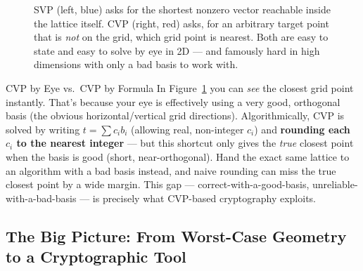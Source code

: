\begin{figure}[h]
\centering
{}
\caption{SVP (left, blue) asks for the shortest nonzero vector reachable inside the lattice itself. CVP (right, red) asks, for an arbitrary target point that is \emph{not} on the grid, which grid point is nearest. Both are easy to state and easy to solve by eye in 2D --- and famously hard in high dimensions with only a bad basis to work with.}
\label{fig:svp-cvp}
\end{figure}

\begin{exbox}{CVP by Eye vs.\ CVP by Formula}
In Figure~\ref{fig:svp-cvp} you can \emph{see} the closest grid point instantly. That's because your eye is effectively using a very good, orthogonal basis (the obvious horizontal/vertical grid directions). Algorithmically, CVP is solved by writing $t = \sum c_i b_i$ (allowing real, non-integer $c_i$) and \textbf{rounding each $c_i$ to the nearest integer} --- but this shortcut only gives the \emph{true} closest point when the basis is good (short, near-orthogonal). Hand the exact same lattice to an algorithm with a bad basis instead, and naive rounding can miss the true closest point by a wide margin. This gap --- correct-with-a-good-basis, unreliable-with-a-bad-basis --- is precisely what CVP-based cryptography exploits.
\end{exbox}

\subsection{The Big Picture: From Worst-Case Geometry to a Cryptographic Tool}
\label{sec:L2:the-big-picture-from-worst-case-geometry}

